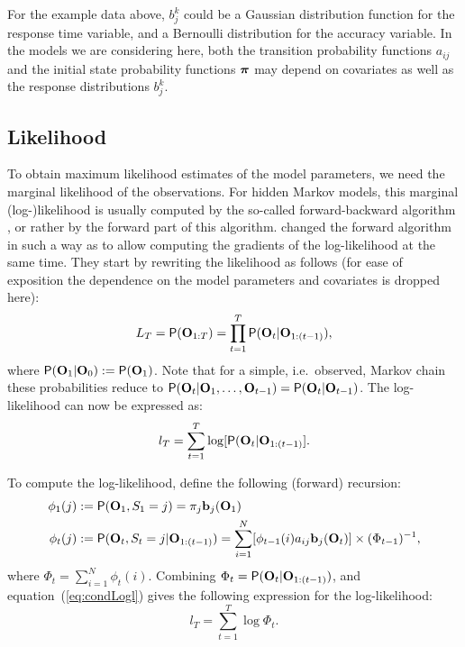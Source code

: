 \documentclass[article]{jss}
\newcommand{\vc}{\mathbf}
\newcommand{\greekv}[1]{\mbox{\boldmath$\mathrm{#1}$}}
\begin{document}
For the example data above, $b_j^k$ could be a Gaussian distribution
function for the response time variable, and a Bernoulli distribution
for the accuracy variable.  In the models we are considering here,
both the transition probability functions $a_{ij}$ and the initial
state probability functions $\greekv{\pi}$ may depend on covariates as
well as the response distributions $b_{j}^{k}$.

\subsection{Likelihood}

To obtain maximum likelihood estimates of the model parameters, we
need the marginal likelihood of the observations.  For hidden Markov
models, this marginal (log-)likelihood is usually computed by the
so-called forward-backward algorithm \citep{Baum1966,Rabiner1989}, or
rather by the forward part of this algorithm.  \cite{Lystig2002}
changed the forward algorithm in such a way as to allow computing the
gradients of the log-likelihood at the same time.  They start by
rewriting the likelihood as follows (for ease of exposition the
dependence on the model parameters and covariates is dropped here):
\begin{equation}
	L_{T} = \Prob(\vc{O}_{1:T}) = \prod_{t=1}^{T} 
	\Prob(\vc{O}_{t}|\vc{O}_{1:(t-1)}), 
	\label{condLike}
\end{equation}
where $\Prob(\vc{O}_{1}|\vc{O}_{0}):=\Prob(\vc{O}_{1})$. Note that for a 
simple, i.e.\ observed, Markov chain these probabilities reduce to 
$\Prob(\vc{O}_{t}|\vc{O}_{1},\ldots, 
\vc{O}_{t-1})=\Prob(\vc{O}_{t}|\vc{O}_{t-1})$.
The log-likelihood can now be expressed as:
\begin{equation}
	l_{T} = \sum_{t=1}^{T} \log[\Prob(\vc{O}_{t}|\vc{O}_{1:(t-1)}].
	\label{eq:condLogl}
\end{equation}

To compute the log-likelihood, \cite{Lystig2002} define the following 
(forward) recursion:
\begin{align}
	\phi_{1}(j) &:= \Prob(\vc{O}_{1}, S_{1}=j) = \pi_{j} \vc{b}_{j}(\vc{O}_{1}) 
	\label{eq:fwd1} \\
	\phi_{t}(j) &:= \Prob(\vc{O}_{t}, S_{t}=j|\vc{O}_{1:(t-1)}) %
	= \sum_{i=1}^{N} [\phi_{t-1}(i)a_{ij} \vc{b}_{j}(\vc{O}_{t})] \times 
(\Phi_{t-1})^{-1},
	\label{eq:fwdt} 
\end{align}
where $\Phi_{t}=\sum_{i=1}^{N} \phi_{t}(i)$. Combining 
$\Phi_{t}=\Prob(\vc{O}_{t}|\vc{O}_{1:(t-1)})$, and 
equation~(\ref{eq:condLogl}) gives the following expression for the 
log-likelihood:
\begin{equation}
	l_{T} = \sum_{t=1}^{T} \log \Phi_{t}.
	\label{eq:logl}
\end{equation}
\end{document}
